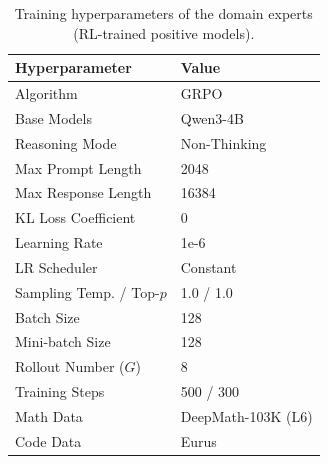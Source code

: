 \documentclass{article}
\begin{document}
\begin{table}[t]
\begin{minipage}[t]{0.48\textwidth}
\end{minipage}
\hfill
%
\begin{minipage}[t]{0.48\textwidth}
\vspace{5pt}
\centering
\scriptsize
\caption{Training hyperparameters of the domain experts (RL-trained positive models).}
\label{tab:expert_hparams}
\begin{tabular}{ll}
\toprule
\textbf{Hyperparameter} & \textbf{Value} \\
\midrule
Algorithm & GRPO \\
Base Models & Qwen3-4B \\
Reasoning Mode & Non-Thinking \\
Max Prompt Length & 2048 \\
Max Response Length & 16384 \\
KL Loss Coefficient & 0 \\
Learning Rate & 1e-6 \\
LR Scheduler & Constant \\
Sampling Temp. / Top-$p$ & 1.0 / 1.0 \\
Batch Size & 128 \\
Mini-batch Size & 128 \\
Rollout Number ($G$) & 8 \\
Training Steps & 500 / 300 \\
\midrule
Math Data & DeepMath-103K (L6) \\
Code Data & Eurus \\
\bottomrule
\end{tabular}

\end{minipage}
\end{table}

\begin{table}[t]
\centering
\caption{On-policy rollout prompts used during OPD training.}
\vspace{5pt}
\label{tab:train_prompt}

\end{table}
\end{document}
